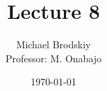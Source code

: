 


\title{Lecture 8}
\date{\today}
\author{Michael Brodskiy\\ \small Professor: M. Onabajo}



\maketitle

